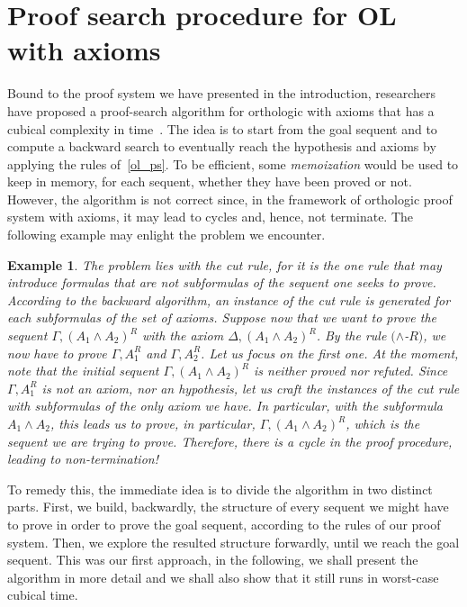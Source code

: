 \documentclass[a4paper, 11pt]{article}
\newtheorem{example}[theorem]{Example}
\begin{document}
    \section{Proof search procedure for OL with axioms}
    Bound to the proof system we have presented in the introduction, researchers have proposed a
    proof-search algorithm for orthologic with axioms that has a cubical complexity in 
    time~\cite{10.1145/3632881}. The idea is
    to start from the goal sequent and to compute a backward search to eventually reach the hypothesis 
    and axioms by applying the rules of~\ref{ol_ps}. To be efficient, some \textit{memoization} would
    be used to keep in memory, for each sequent, whether they have been proved or not. However, the 
    algorithm is not correct since, in the framework of orthologic proof system with axioms, it may 
    lead to cycles and, hence, not terminate. The following example may enlight the problem we 
    encounter.
    \begin{example}
	The problem lies with the cut rule, for it is the one rule that may introduce formulas that are
	    not subformulas of the sequent one seeks to prove. According to the backward algorithm,
	    an instance of the cut rule is generated for each subformulas of the set of axioms. Suppose
	    now that we want to prove the sequent $\Gamma,(A_1\wedge A_2)^R$ with the axiom 
	    $\Delta,(A_1\wedge A_2)^R$. By the rule 
	    $(\wedge$-$R)$, we now have to prove $\Gamma,A_1^R$ and $\Gamma,A_2^R$. Let us focus on the
	    first one. At the moment, note that the initial sequent $\Gamma,(A_1\wedge A_2)^R$ is neither
	    proved nor refuted. Since $\Gamma,A_1^R$ is not an axiom, nor an hypothesis, let us craft
	    the instances of the cut rule with subformulas of the only axiom we have. In particular, 
	    with the subformula $A_1\wedge A_2$,
	    this leads us to prove, in particular, $\Gamma,(A_1\wedge A_2)^R$, which is the sequent we
	    are trying to prove. Therefore, there is a cycle in the proof procedure, leading to
	    non-termination!
    \end{example}
    To remedy this, the immediate idea is to divide the algorithm in two distinct parts. First,
    we build, backwardly, the structure of every sequent we might have to prove in order to prove the 
    goal 
    sequent, according to the rules of our proof system. Then, we explore the resulted structure
    forwardly, until we reach the goal sequent. This was our first approach, in the following, we shall 
    present the algorithm in more detail and we shall also show that it still runs in worst-case 
    cubical time. 
\end{document}

